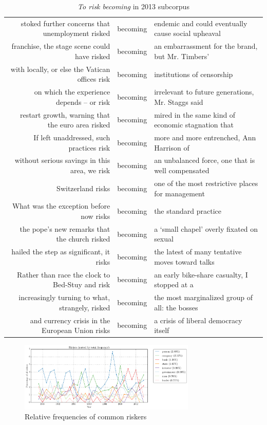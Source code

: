 \begin{table}
\footnotesize
\begin{tabular}{rcl}
stoked further concerns that unemployment risked &  becoming &  endemic and could eventually cause social upheaval  \\ 
franchise, the stage scene could have risked &  becoming &  an embarrassment for the brand, but Mr. Timbers'   \\ 
with locally, or else the Vatican offices risk &  becoming &  institutions of censorship   \\ 
on which the experience depends -- or risk &  becoming &  irrelevant to future generations, Mr. Staggs said   \\ 
restart growth, warning that the euro area risked &  becoming &  mired in the same kind of economic stagnation that   \\ 
If left unaddressed, such practices risk &  becoming &  more and more entrenched, Ann Harrison of   \\ 
without serious savings in this area, we risk &  becoming &  an unbalanced force, one that is well compensated   \\ 
Switzerland risks &  becoming &  one of the most restrictive places for management   \\ 
What was the exception before now risks &  becoming &  the standard practice   \\ 
the pope's new remarks that the church risked &  becoming &  a `small chapel' overly fixated on sexual   \\ 
hailed the step as significant, it risks &  becoming &  the latest of many tentative moves toward talks   \\ 
Rather than race the clock to Bed-Stuy and risk &  becoming &  an early bike-share casualty, I stopped at a   \\ 
increasingly turning to what, strangely, risked &  becoming &  the most marginalized group of all: the bosses   \\ 
and currency crisis in the European Union risks &  becoming &  a crisis of liberal democracy itself \\ 
\end{tabular}
\caption{\emph{To risk becoming} in 2013 subcorpus}
\label{conc:riskbecoming}
\end{table}

\begin{figure}[htb!]
\centering
\includegraphics[width=0.75\textwidth]{../images/riskers-sorted-by-total-frequency.png}
\caption{Relative frequencies of common riskers}
\label{fig:riskers}
\end{figure}

